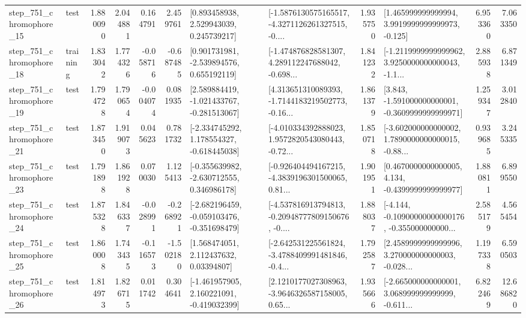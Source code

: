 \begin{tabular}{llrrrrllrlrr}
  step\_751\_chromophore\_15 &      test &      1.880090 &    2.044881 &      0.164791 &  2.459761 &     [0.893458938, 2.529943039, 0.245739217] &  [-1.5876130575165517, -4.3271126261327515, -0.... &       1.935750 &    [1.465999999999994, 3.9919999999999973, -0.125] &            6.953360 &          7.063350 \\
  step\_751\_chromophore\_18 &  training &      1.833042 &    1.774326 &     -0.058716 & -0.687485 &    [0.901731981, -2.539894576, 0.655192119] &  [-1.474876828581307, 4.289112247688042, -0.698... &       1.841232 &  [-1.2119999999999962, 3.9250000000000043, -1.1... &            2.885938 &          6.871349 \\
  step\_751\_chromophore\_19 &      test &      1.794728 &    1.790654 &     -0.004074 &  0.081935 &   [2.589884419, -1.021433767, -0.281513067] &  [4.313651310089393, -1.7144183219502773, -0.16... &       1.861379 &   [3.843, -1.591000000000001, -0.3609999999999971] &            1.259347 &          3.012840 \\
  step\_751\_chromophore\_21 &      test &      1.873450 &    1.919073 &      0.045623 &  0.781732 &   [-2.334745292, 1.178554327, -0.618445038] &  [-4.010334392888023, 1.9572820543080443, -0.72... &       1.850718 &  [-3.602000000000002, 1.7890000000000015, -0.88... &            0.939685 &          3.245335 \\
  step\_751\_chromophore\_23 &      test &      1.791898 &    1.861928 &      0.070030 &  1.125413 &   [-0.355639982, -2.630712555, 0.346986178] &  [-0.926404494167215, -4.3839196301500065, 0.81... &       1.901951 &   [0.4670000000000005, 4.134, -0.4399999999999977] &            1.880811 &          6.899550 \\
  step\_751\_chromophore\_24 &      test &      1.875328 &    1.846337 &     -0.028991 & -0.268921 &  [-2.682196459, -0.059103476, -0.351698479] &  [-4.537816913794813, -0.20948777809150676, -0.... &       1.888037 &  [-4.144, -0.10900000000000176, -0.355000000000... &            2.585179 &          4.565454 \\
  step\_751\_chromophore\_25 &      test &      1.860008 &    1.743435 &     -0.116573 & -1.502180 &      [1.568474051, 2.112437632, 0.03394807] &  [-2.642531225561824, -3.4788409991481846, -0.4... &       1.792587 &  [2.4589999999999996, 3.270000000000003, -0.028... &            1.197338 &          6.590503 \\
  step\_751\_chromophore\_26 &      test &      1.814973 &    1.826715 &      0.011742 &  0.304641 &   [-1.461957905, 2.160221091, -0.419032399] &  [2.1210177027308963, -3.9646326587158005, 0.65... &       1.935666 &  [-2.665000000000001, 3.068999999999999, -0.611... &            6.822469 &         12.686820 \\

\end{tabular}
